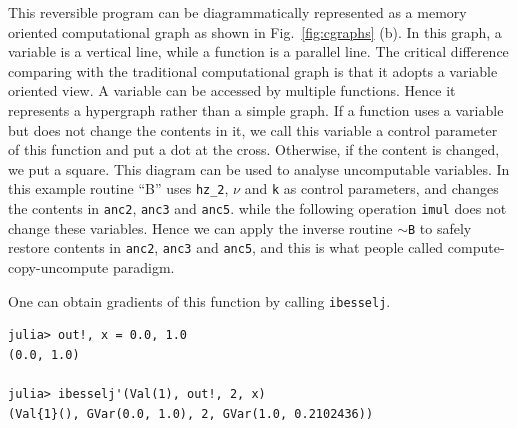\documentclass{article}
\newcommand{\<}{\langle}
\renewcommand{\>}{\rangle}
\newcommand{\Fig}[1]{Fig.~\ref{#1}}
\theoremstyle{definition}\newtheorem{definition}{\textit{Definition}}
\begin{document}
This reversible program can be diagrammatically represented as a memory oriented computational graph as shown in \Fig{fig:cgraphs} (b).
In this graph, a variable is a vertical line, while a function is a parallel line.
The critical difference comparing with the traditional computational graph is that it adopts a variable oriented view.
A variable can be accessed by multiple functions. Hence it represents a hypergraph rather than a simple graph.
If a function uses a variable but does not change the contents in it, we call this variable a control parameter of this function and put a dot at the cross. Otherwise, if the content is changed, we put a square.
This diagram can be used to analyse uncomputable variables. In this example routine ``B'' uses \texttt{hz\_2}, \texttt{$\nu$} and \texttt{k} as control parameters, and changes the contents in \texttt{anc2}, \texttt{anc3} and \texttt{anc5}.
while the following operation \texttt{imul} does not change these variables.
Hence we can apply the inverse routine \texttt{$\sim$B} to safely restore contents in \texttt{anc2}, \texttt{anc3} and \texttt{anc5}, and this is what people called compute-copy-uncompute paradigm.


One can obtain gradients of this function by calling \texttt{ibesselj\textquotesingle}.

\begin{minipage}{.88\columnwidth}
\begin{lstlisting}
julia> out!, x = 0.0, 1.0
(0.0, 1.0)

julia> ibesselj'(Val(1), out!, 2, x)
(Val{1}(), GVar(0.0, 1.0), 2, GVar(1.0, 0.2102436))
\end{lstlisting}
\end{minipage}
\end{document}
